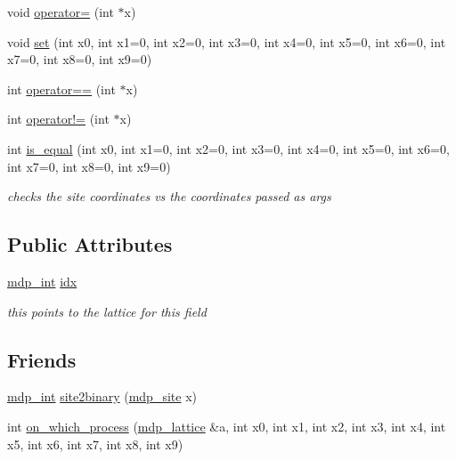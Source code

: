 \begin{DoxyCompactItemize}
void \hyperlink{classmdp__site_a8cf72becd9e8d125b31a5a40862bfa5a}{operator=} (int $\ast$x)
\item 
void \hyperlink{classmdp__site_a241eb259576cbe7354d1ff714d22416c}{set} (int x0, int x1=0, int x2=0, int x3=0, int x4=0, int x5=0, int x6=0, int x7=0, int x8=0, int x9=0)
\item 
int \hyperlink{classmdp__site_af311165eb929fe7cf2957742009590b9}{operator==} (int $\ast$x)
\item 
int \hyperlink{classmdp__site_a424ed9f2670e12a0a3fe521070fc5d41}{operator!=} (int $\ast$x)
\item 
int \hyperlink{classmdp__site_a0bf9ef3d304245c68e00d7b66886f020}{is\+\_\+equal} (int x0, int x1=0, int x2=0, int x3=0, int x4=0, int x5=0, int x6=0, int x7=0, int x8=0, int x9=0)
\begin{DoxyCompactList}\small\item\em checks the site coordinates vs the coordinates passed as args \end{DoxyCompactList}\end{DoxyCompactItemize}
\subsection*{Public Attributes}
\begin{DoxyCompactItemize}
\item 
\hyperlink{mdp__global__vars_8h_aaa1ad9d0dcd2124aa5af0120d9954174}{mdp\+\_\+int} \hyperlink{classmdp__site_a28354e929a397ee9b0030abe2583b29b}{idx}
\begin{DoxyCompactList}\small\item\em this points to the lattice for this field \end{DoxyCompactList}\end{DoxyCompactItemize}
\subsection*{Friends}
\begin{DoxyCompactItemize}
\item 
\hyperlink{mdp__global__vars_8h_aaa1ad9d0dcd2124aa5af0120d9954174}{mdp\+\_\+int} \hyperlink{classmdp__site_a03c9871dd1382a293be5394fafda9718}{site2binary} (\hyperlink{classmdp__site}{mdp\+\_\+site} x)
\item 
int \hyperlink{classmdp__site_ac96405ecdb78dc33d55edea04876a931}{on\+\_\+which\+\_\+process} (\hyperlink{classmdp__lattice}{mdp\+\_\+lattice} \&a, int x0, int x1, int x2, int x3, int x4, int x5, int x6, int x7, int x8, int x9)
\end{DoxyCompactItemize}



